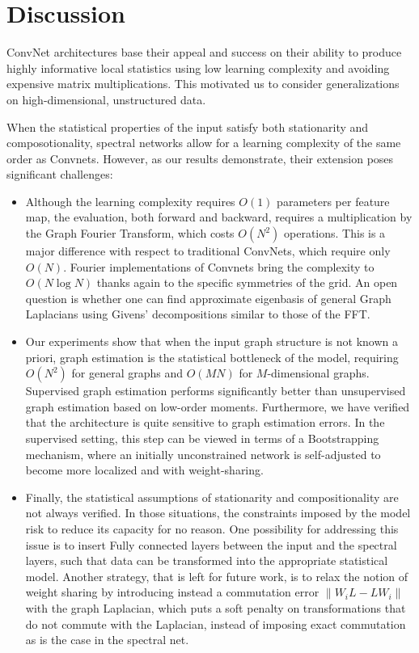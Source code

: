 \documentclass{article} %
\begin{document}
\section{Discussion}

ConvNet architectures base their appeal and success on their 
ability to produce highly informative local statistics using low learning complexity
and avoiding expensive matrix multiplications. This motivated us to 
consider generalizations on high-dimensional, unstructured data.

When the statistical properties of the input satisfy both stationarity 
and composotionality, spectral networks allow for a learning complexity 
of the same order as Convnets. However, as our results demonstrate, 
their extension poses significant challenges:
\begin{itemize}
\item Although the learning complexity requires $O(1)$ parameters per feature map, 
the evaluation, both forward and backward, requires a multiplication by the Graph Fourier Transform, 
which costs $O(N^2)$ operations. This is a major difference with respect to traditional ConvNets, which 
require only $O(N)$. Fourier implementations of Convnets \cite{mathieu2013fast, DBLP:journals/corr/VasilacheJMCPL14} bring the complexity to $O(N \log N)$ 
thanks again to the specific symmetries of the grid. An open question is whether one can find approximate eigenbasis
of general Graph Laplacians using Givens' decompositions similar to those of the FFT. 

\item Our experiments show that when the input graph structure is not known a priori, graph estimation is
the statistical bottleneck of the model, requiring $O(N^2)$ for general graphs and $O(M N)$ for $M$-dimensional graphs.
Supervised graph estimation performs significantly better than unsupervised graph estimation based on low-order moments. Furthermore, we have verified that
the architecture is quite sensitive to graph estimation errors. In the supervised setting, this step can be viewed in terms of
a Bootstrapping mechanism, where an initially unconstrained network is self-adjusted to become more localized and with weight-sharing. 

\item Finally, the statistical assumptions of stationarity and compositionality are not always verified. In those situations, the constraints
imposed by the model risk to reduce its capacity for no reason. One possibility for addressing this issue is to insert Fully connected 
layers between the input and the spectral layers, such that data can be transformed into the appropriate statistical model. Another strategy, that is
left for future work, is to relax the notion of weight sharing by introducing instead a commutation error $\| W_i L - L W_i \|$ with the graph Laplacian, 
which puts a soft penalty on transformations that do not commute with the Laplacian, instead of imposing exact commutation as is the case in the spectral net. 

\end{itemize}

\pagebreak

{}

\end{document}
